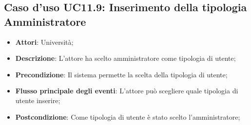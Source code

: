 \subsection{Caso d'uso \texorpdfstring{UC11.9}{UC11.9}: Inserimento della tipologia Amministratore}
\begin{itemize}
	\item \textbf{Attori}: Università;
	\item \textbf{Descrizione}: L'attore ha scelto amministratore come tipologia di utente; 
	\item \textbf{Precondizione}: Il sistema permette la scelta della tipologia di utente;
	\item \textbf{Flusso principale degli eventi}: L'attore può scegliere quale tipologia di utente inserire;
	\item \textbf{Postcondizione}: Come tipologia di utente è stato scelto l'amministratore;
\end{itemize}
